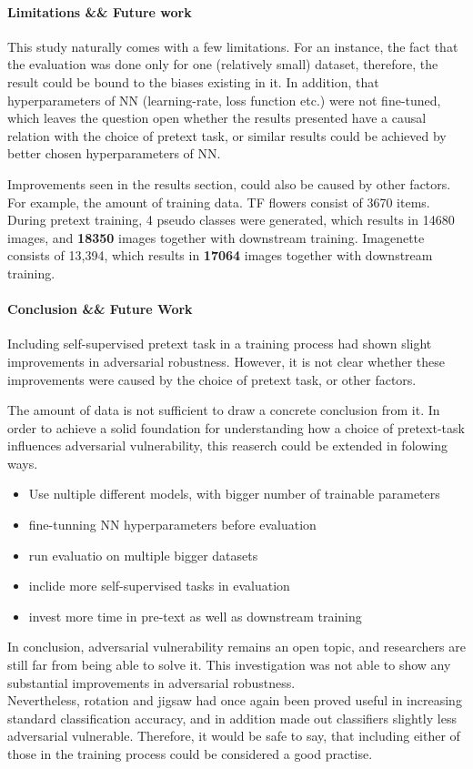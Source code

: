 \paragraph{Limitations \&\& Future work}
This study naturally comes with a few limitations.
For an instance, the fact that the evaluation was done only for one (relatively small) dataset,
therefore, the result could be bound to the biases existing in it.
In addition, that hyperparameters of NN (learning-rate, loss function etc.)
were not fine-tuned, which leaves the question open whether the
results presented have a causal relation with the choice of pretext task,
or similar results could be achieved by better chosen hyperparameters of NN.

Improvements seen in the results section, could also be caused by other factors.
For example, the amount of training data.
TF flowers consist of 3670 items.
During pretext training, 4 pseudo classes were generated,
which results in 14680 images, and \textbf{18350} images together with downstream training.
Imagenette consists of 13,394, which results in \textbf{17064} images together with downstream training.



\paragraph{Conclusion \&\& Future Work}
Including self-supervised pretext task in a training process had shown slight improvements in adversarial robustness.
However, it is not clear whether these improvements were caused by the choice of pretext task, or other factors.

The amount of data is not sufficient to draw a concrete conclusion from it.
In order to achieve a solid foundation for understanding how a choice of pretext-task influences adversarial vulnerability,
this reaserch could be extended in folowing ways.
\begin{itemize}
    \item Use nultiple different models, with bigger number of trainable parameters
    \item fine-tunning NN hyperparameters before evaluation
    \item run evaluatio on multiple bigger datasets
    \item inclide more self-supervised tasks in evaluation
    \item invest more time in pre-text as well as downstream training
\end{itemize}


In conclusion, adversarial vulnerability remains an open topic,
and researchers are still far from being able to solve it.
This investigation was not able to show any substantial improvements in adversarial robustness.
\\
Nevertheless, rotation and jigsaw had once again been proved useful in increasing standard classification accuracy,
and in addition made out classifiers slightly less adversarial vulnerable.
Therefore, it would be safe to say, that including either of those in the training process could be considered a good practise.


